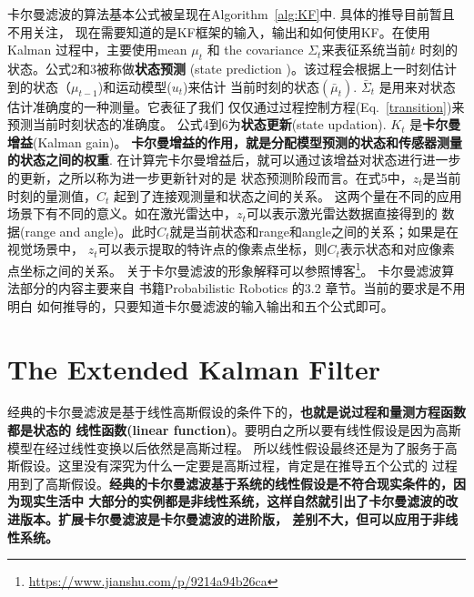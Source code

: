 \documentclass[UTF8,a4paper,10pt]{ctexart}
\begin{document}
卡尔曼滤波的算法基本公式被呈现在Algorithm~\ref{alg:KF}中. 具体的推导目前暂且不用关注，
现在需要知道的是KF框架的输入，输出和如何使用KF。在使用Kalman 过程中，主要使用mean $\mu_t$ 
和 the covariance $\Sigma_t$来表征系统当前$t$ 时刻的状态。公式2和3被称做{\bfseries 状态预测}
(state prediction )。该过程会根据上一时刻估计到的状态（$\mu_{t-1}$)和运动模型($u_{t}$)来估计
当前时刻的状态$(\bar{\mu}_t)$. $\bar{\Sigma}_t$ 是用来对状态估计准确度的一种测量。它表征了我们
仅仅通过过程控制方程(Eq.~\eqref{transition})来预测当前时刻状态的准确度。
公式4到6为{\bfseries 状态更新}(state updation). $K_t$ 是{\bfseries 卡尔曼增益}(Kalman gain)。
{\bfseries 卡尔曼增益的作用，就是分配模型预测的状态和传感器测量的状态之间的权重}. 
在计算完卡尔曼增益后，就可以通过该增益对状态进行进一步的更新，之所以称为进一步更新针对的是
状态预测阶段而言。在式5中，$z_t$是当前时刻的量测值，$C_t$ 起到了连接观测量和状态之间的关系。
这两个量在不同的应用场景下有不同的意义。如在激光雷达中，$z_t$可以表示激光雷达数据直接得到的
数据(range and angle)。此时$C_t$就是当前状态和range和angle之间的关系；如果是在视觉场景中，
$z_t$可以表示提取的特许点的像素点坐标，则$C_t$表示状态和对应像素点坐标之间的关系。
关于卡尔曼滤波的形象解释可以参照博客\footnote{\url{https://www.jianshu.com/p/9214a94b26ca}}。
卡尔曼滤波算法部分的内容主要来自 书籍Probabilistic Robotics 的3.2 章节。当前的要求是不用明白
如何推导的，只要知道卡尔曼滤波的输入输出和五个公式即可。

\section{The Extended Kalman Filter}
经典的卡尔曼滤波是基于线性高斯假设的条件下的，{\bfseries 也就是说过程和量测方程函数都是状态的
线性函数(linear function)}。要明白之所以要有线性假设是因为高斯模型在经过线性变换以后依然是高斯过程。
所以线性假设最终还是为了服务于高斯假设。这里没有深究为什么一定要是高斯过程，肯定是在推导五个公式的
过程用到了高斯假设。{\bfseries 经典的卡尔曼滤波基于系统的线性假设是不符合现实条件的，因为现实生活中
大部分的实例都是非线性系统，这样自然就引出了卡尔曼滤波的改进版本。扩展卡尔曼滤波是卡尔曼滤波的进阶版，
差别不大，但可以应用于非线性系统。}
\end{document}
